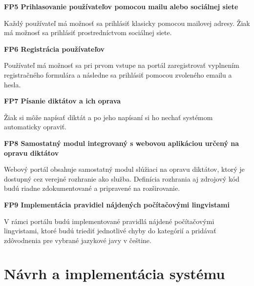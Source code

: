 \documentclass[12pt,oneside]{fithesis2}
\begin{document}
\bigskip
     \textbf{FP5 Prihlasovanie používateľov pomocou mailu alebo sociálnej siete}
	\par Každý používateľ má možnosť sa prihlásiť klasicky pomocou mailovej adresy. Žiak má možnosť sa prihlásiť prostredníctvom sociálnej siete.
	
\bigskip
     \textbf{FP6 Registrácia používateľov}
     \par Používateľ má možnosť sa pri prvom vstupe na portál zaregistrovať vyplnením registračného formulára a následne sa prihlásiť pomocou zvoleného emailu a hesla.
     
\bigskip
     \textbf{FP7 Písanie diktátov a ich oprava} 
     \par Žiak si môže napísať diktát a po jeho napísaní si ho nechať systémom automaticky opraviť.
     
\bigskip
     \textbf{FP8 Samostatný modul integrovaný s webovou aplikáciou určený na opravu diktátov}
     \par Webový portál obsahuje samostatný modul slúžiaci na opravu diktátov, ktorý je dostupný cez verejné rozhranie ako služba.  Definícia rozhrania aj zdrojový kód budú riadne zdokumentované a pripravené na rozširovanie.         

\bigskip
     \textbf{FP9 Implementácia pravidiel nájdených počítačovými lingvistami}      		
	\par V rámci portálu budú implementované pravidlá nájdené počítačovými lingvistami, ktoré budú triediť jednotlivé chyby do kategórií a pridávať zdôvodnenia pre vybrané jazykové javy v češtine.

\chapter{Návrh a implementácia systému}
    
\end{document}
